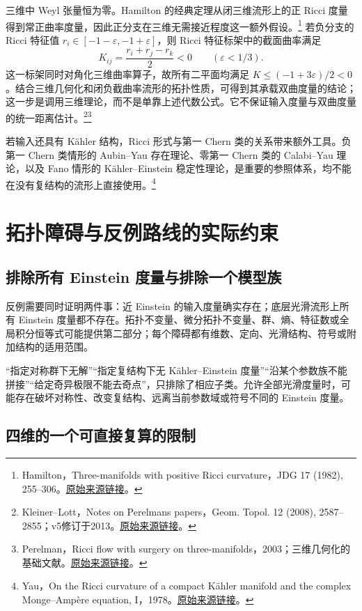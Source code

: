 \documentclass[11pt,a4paper]{article}
\theoremstyle{definition}
\newcommand{\src}[3]{\footnote{\raggedright #1，#2。\href{#3}{原始来源链接}。}}
\begin{document}
三维中 Weyl 张量恒为零。Hamilton 的经典定理从闭三维流形上的正 Ricci 度量得到常正曲率度量，因此正分支在三维无需接近程度这一额外假设。\src{Hamilton}{Three-manifolds with positive Ricci curvature，JDG 17 (1982), 255--306}{https://doi.org/10.4310/jdg/1214436922}
若负分支的 Ricci 特征值 $r_i\in[-1-\varepsilon,-1+\varepsilon]$，则 Ricci 特征标架中的截面曲率满足
\[
K_{ij}=\frac{r_i+r_j-r_k}{2}<0\qquad(\varepsilon<1/3).
\]
这一标架同时对角化三维曲率算子，故所有二平面均满足 $K\le(-1+3\varepsilon)/2<0$。结合三维几何化和闭负截曲率流形的拓扑性质，可得到其承载双曲度量的结论；这一步是调用三维理论，而不是单靠上述代数公式。它不保证输入度量与双曲度量的统一距离估计。\src{Kleiner--Lott}{Notes on Perelman\textquotesingle s papers，Geom. Topol. 12 (2008), 2587--2855；v5修订于2013}{https://arxiv.org/abs/math/0605667v5}\src{Perelman}{Ricci flow with surgery on three-manifolds，2003；三维几何化的基础文献}{https://arxiv.org/abs/math/0303109}

若输入还具有 Kähler 结构，Ricci 形式与第一 Chern 类的关系带来额外工具。负第一 Chern 类情形的 Aubin--Yau 存在理论、零第一 Chern 类的 Calabi--Yau 理论，以及 Fano 情形的 Kähler--Einstein 稳定性理论，是重要的参照体系，均不能在没有复结构的流形上直接使用。\src{Yau}{On the Ricci curvature of a compact Kähler manifold and the complex Monge--Ampère equation, I，1978}{https://doi.org/10.1002/cpa.3160310304}

\section{拓扑障碍与反例路线的实际约束}\label{sec:obstruction}

\subsection{排除所有 Einstein 度量与排除一个模型族}

反例需要同时证明两件事：近 Einstein 的输入度量确实存在；底层光滑流形上所有 Einstein 度量都不存在。拓扑不变量、微分拓扑不变量、群、熵、特征数或全局积分恒等式可能提供第二部分；每个障碍都有维数、定向、光滑结构、符号或附加结构的适用范围。

“指定对称群下无解”“指定复结构下无 Kähler--Einstein 度量”“沿某个参数族不能拼接”“给定奇异极限不能去奇点”，只排除了相应子类。允许全部光滑度量时，可能存在破坏对称性、改变复结构、远离当前参数域或符号不同的 Einstein 度量。

\subsection{四维的一个可直接复算的限制}
\end{document}
